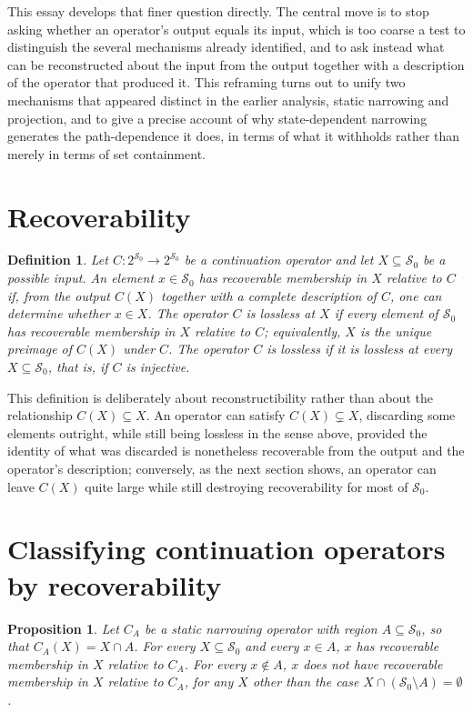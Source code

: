 \documentclass[11pt]{article}
\newtheorem{proposition}{Proposition}
\newtheorem{definition}{Definition}
\begin{document}
This essay develops that finer question directly. The central move is to stop asking whether an operator's output equals its input, which is too coarse a test to distinguish the several mechanisms already identified, and to ask instead what can be reconstructed about the input from the output together with a description of the operator that produced it. This reframing turns out to unify two mechanisms that appeared distinct in the earlier analysis, static narrowing and projection, and to give a precise account of why state-dependent narrowing generates the path-dependence it does, in terms of what it withholds rather than merely in terms of set containment.

\section{Recoverability}

\begin{definition}
Let $C : 2^{\mathcal{S}_0} \to 2^{\mathcal{S}_0}$ be a continuation operator and let $X \subseteq \mathcal{S}_0$ be a possible input. An element $x \in \mathcal{S}_0$ has \emph{recoverable membership} in $X$ relative to $C$ if, from the output $C(X)$ together with a complete description of $C$, one can determine whether $x \in X$. The operator $C$ is \emph{lossless at $X$} if every element of $\mathcal{S}_0$ has recoverable membership in $X$ relative to $C$; equivalently, $X$ is the unique preimage of $C(X)$ under $C$. The operator $C$ is \emph{lossless} if it is lossless at every $X \subseteq \mathcal{S}_0$, that is, if $C$ is injective.
\end{definition}

This definition is deliberately about reconstructibility rather than about the relationship $C(X) \subseteq X$. An operator can satisfy $C(X) \subsetneq X$, discarding some elements outright, while still being lossless in the sense above, provided the identity of what was discarded is nonetheless recoverable from the output and the operator's description; conversely, as the next section shows, an operator can leave $C(X)$ quite large while still destroying recoverability for most of $\mathcal{S}_0$.

\section{Classifying continuation operators by recoverability}

\begin{proposition}
Let $C_A$ be a static narrowing operator with region $A \subseteq \mathcal{S}_0$, so that $C_A(X) = X \cap A$. For every $X \subseteq \mathcal{S}_0$ and every $x \in A$, $x$ has recoverable membership in $X$ relative to $C_A$. For every $x \notin A$, $x$ does not have recoverable membership in $X$ relative to $C_A$, for any $X$ other than the case $X \cap (\mathcal{S}_0 \setminus A) = \emptyset$.
\end{proposition}
\end{document}
